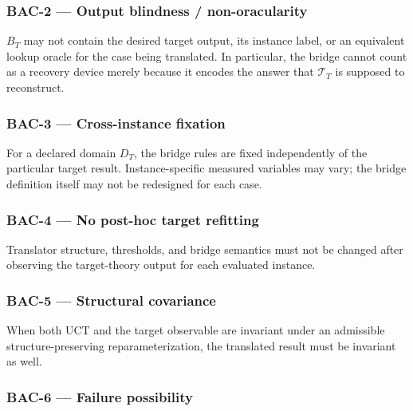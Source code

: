 \documentclass[
  11pt,
  a4paper,
]{article}
\begin{document}
\hypertarget{bac-2-output-blindness-non-oracularity}{%
\subsubsection{BAC-2 --- Output blindness /
non-oracularity}\label{bac-2-output-blindness-non-oracularity}}

\(B_T\) may not contain the desired target output, its instance label,
or an equivalent lookup oracle for the case being translated. In
particular, the bridge cannot count as a recovery device merely because
it encodes the answer that \(\mathcal T_T\) is supposed to reconstruct.

\hypertarget{bac-3-cross-instance-fixation}{%
\subsubsection{BAC-3 --- Cross-instance
fixation}\label{bac-3-cross-instance-fixation}}

For a declared domain \(D_T\), the bridge rules are fixed independently
of the particular target result. Instance-specific measured variables
may vary; the bridge definition itself may not be redesigned for each
case.

\hypertarget{bac-4-no-post-hoc-target-refitting}{%
\subsubsection{BAC-4 --- No post-hoc target
refitting}\label{bac-4-no-post-hoc-target-refitting}}

Translator structure, thresholds, and bridge semantics must not be
changed after observing the target-theory output for each evaluated
instance.

\hypertarget{bac-5-structural-covariance}{%
\subsubsection{BAC-5 --- Structural
covariance}\label{bac-5-structural-covariance}}

When both UCT and the target observable are invariant under an
admissible structure-preserving reparameterization, the translated
result must be invariant as well.

\hypertarget{bac-6-failure-possibility}{%
\subsubsection{BAC-6 --- Failure
possibility}\label{bac-6-failure-possibility}}
\end{document}
